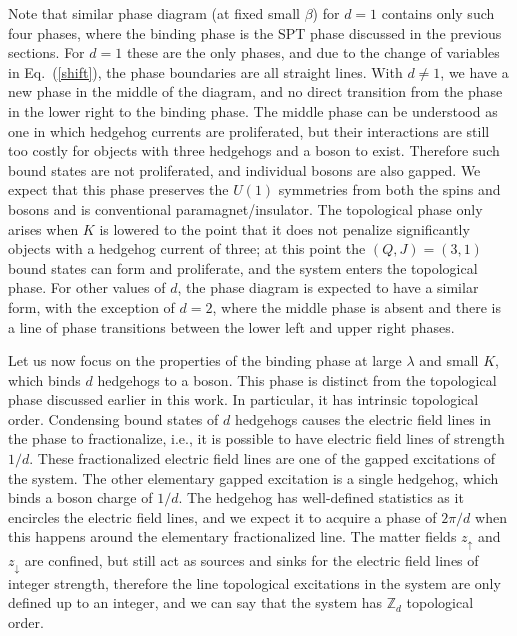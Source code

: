 \documentclass[prb,twocolumn]{revtex4-1}
\begin{document}
Note that similar phase diagram (at fixed small $\beta$) for $d=1$ contains only such four phases, where the binding phase is the SPT phase discussed in the previous sections. For $d=1$ these are the only phases, and due to the change of variables in Eq.~(\ref{shift}), the phase boundaries are all straight lines.
With $d\neq 1$, we have a new phase in the middle of the diagram, and no direct transition from the phase in the lower right to the binding phase. The middle phase can be understood as one in which hedgehog currents are proliferated, but their interactions are still too costly for objects with three hedgehogs and a boson to exist. Therefore such bound states are not proliferated, and individual bosons are also gapped.  We expect that this phase preserves the $U(1)$ symmetries from both the spins and bosons and is conventional paramagnet/insulator. The topological phase only arises when $K$ is lowered to the point that it does not penalize significantly objects with a hedgehog current of three; at this point the $(Q, J) = (3, 1)$ bound states can form and proliferate, and the system enters the topological phase. For other values of $d$, the phase diagram is expected to have a similar form, with the exception of $d=2$, where the middle phase is absent and there is a line of phase transitions between the lower left and upper right phases.

Let us now focus on the properties of the binding phase at large $\lambda$ and small $K$, which binds $d$ hedgehogs to a boson. This phase is distinct from the topological phase discussed earlier in this work. In particular, it has intrinsic topological order. Condensing bound states of $d$ hedgehogs causes the electric field lines in the phase to fractionalize, i.e., it is possible to have electric field lines of strength $1/d$. These fractionalized electric field lines are one of the gapped excitations of the system. The other elementary gapped excitation is a single hedgehog, which binds a boson charge of $1/d$. The hedgehog has well-defined statistics as it encircles the electric field lines, and we expect it to acquire a phase of $2\pi/d$ when this happens around the elementary fractionalized line. The matter fields $z_\uparrow$ and $z_\downarrow$ are confined, but still act as sources and sinks for the electric field lines of integer strength, therefore the line topological excitations in the system are only defined up to an integer, and we can say that the system has $\mathbb{Z}_d$ topological order.
\end{document}
